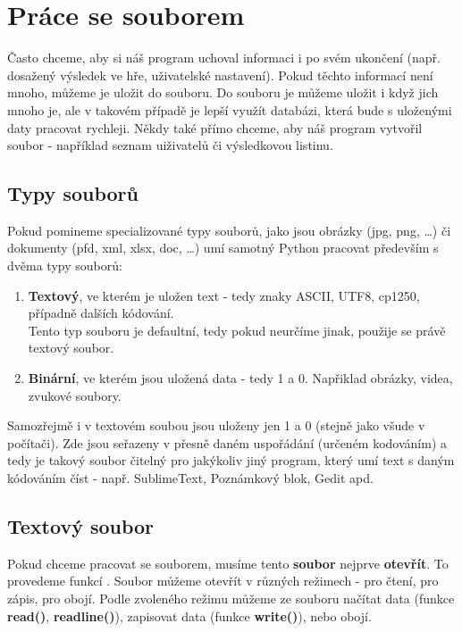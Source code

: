 \section{Práce se souborem}
Často chceme, aby si náš program uchoval informaci i po svém ukončení (např. dosažený výsledek ve hře, uživatelské nastavení). Pokud těchto informací není mnoho, můžeme je uložit do souboru. Do souboru je můžeme uložit i když jich mnoho je, ale v takovém případě je lepší využít databázi, která bude s uloženými daty pracovat rychleji. Někdy také přímo chceme, aby náš program vytvořil soubor - například seznam uiživatelů či výsledkovou listinu.\\

\subsection{Typy souborů}
Pokud pomineme specializované typy souborů, jako jsou obrázky (jpg, png, \dots) či dokumenty (pfd, xml, xlsx, doc, \dots) umí samotný Python pracovat především s dvěma typy souborů:
\begin{enumerate}
\item \textbf{Textový}, ve kterém je uložen text - tedy znaky ASCII, UTF8, cp1250, případně dalších kódování.\\ Tento typ souboru je defaultní, tedy pokud neurčíme jinak, použije se právě textový soubor. 
\item \textbf{Binární}, ve kterém jsou uložená  data - tedy 1 a 0. Napřiklad obrázky, videa, zvukové soubory.
\end{enumerate}
Samozřejmě i v textovém soubou jsou uloženy jen 1 a 0 (stejně jako všude v počítači). Zde jsou seřazeny v přesně daném uspořádání (určeném kodováním) a tedy je takový soubor čitelný pro jakýkoliv jiný program, který umí text s daným kódováním číst - např. SublimeText, Poznámkový blok, Gedit apd.

\subsection{Textový soubor}
Pokud chceme pracovat se souborem, musíme tento \textbf{soubor} nejprve \textbf{otevřít}. To provedeme funkcí . Soubor můžeme otevřít v různých režimech - pro čtení, pro zápis, pro obojí. Podle zvoleného režimu můžeme ze souboru načítat data (funkce \textbf{read()}, \textbf{readline()}), zapisovat data (funkce \textbf{write()}), nebo obojí.\\


